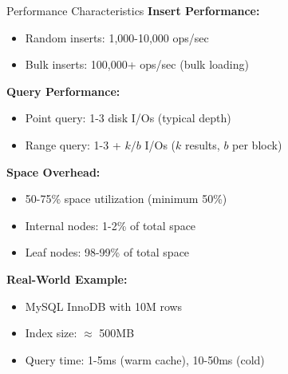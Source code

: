 \documentclass[aspectratio=169]{beamer}
\begin{document}
\begin{frame}{Performance Characteristics}
  \textbf{Insert Performance:}
  \begin{itemize}
    \item Random inserts: 1,000-10,000 ops/sec
    \item Bulk inserts: 100,000+ ops/sec (bulk loading)
  \end{itemize}

  \vspace{0.3cm}
  \textbf{Query Performance:}
  \begin{itemize}
    \item Point query: 1-3 disk I/Os (typical depth)
    \item Range query: 1-3 + $k/b$ I/Os ($k$ results, $b$ per block)
  \end{itemize}

  \vspace{0.3cm}
  \textbf{Space Overhead:}
  \begin{itemize}
    \item 50-75\% space utilization (minimum 50\%)
    \item Internal nodes: 1-2\% of total space
    \item Leaf nodes: 98-99\% of total space
  \end{itemize}

  \vspace{0.3cm}
  \textbf{Real-World Example:}
  \begin{itemize}
    \item MySQL InnoDB with 10M rows
    \item Index size: $\approx$ 500MB
    \item Query time: 1-5ms (warm cache), 10-50ms (cold)
  \end{itemize}
\end{frame}
\end{document}
